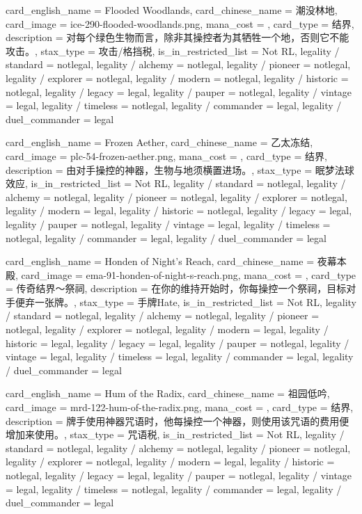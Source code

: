 \documentclass[lang = cn, color = black, 10pt]{AllThatStax}
\begin{document}
\card
{
	card_english_name = {Flooded Woodlands},
	card_chinese_name = {潮没林地},
	card_image = ice-290-flooded-woodlands.png,
	mana_cost = ,
	card_type = 结界,
	description = {对每个绿色生物而言，除非其操控者为其牺牲一个地，否则它不能攻击。},
	stax_type = 攻击/格挡税,
	is_in_restricted_list = Not RL,
	legality / standard = notlegal,
	legality / alchemy = notlegal,
	legality / pioneer = notlegal,
	legality / explorer = notlegal,
	legality / modern = notlegal,
	legality / historic = notlegal,
	legality / legacy = legal,
	legality / pauper = notlegal,
	legality / vintage = legal,
	legality / timeless = notlegal,
	legality / commander = legal,
	legality / duel_commander = legal
}

\card
{
	card_english_name = {Frozen Aether},
	card_chinese_name = {乙太冻结},
	card_image = plc-54-frozen-aether.png,
	mana_cost = ,
	card_type = 结界,
	description = {由对手操控的神器，生物与地须横置进场。},
	stax_type = 眠梦法球效应,
	is_in_restricted_list = Not RL,
	legality / standard = notlegal,
	legality / alchemy = notlegal,
	legality / pioneer = notlegal,
	legality / explorer = notlegal,
	legality / modern = legal,
	legality / historic = notlegal,
	legality / legacy = legal,
	legality / pauper = notlegal,
	legality / vintage = legal,
	legality / timeless = notlegal,
	legality / commander = legal,
	legality / duel_commander = legal
}

\card
{
	card_english_name = {Honden of Night's Reach},
	card_chinese_name = {夜幕本殿},
	card_image = ema-91-honden-of-night-s-reach.png,
	mana_cost = ,
	card_type = 传奇结界～祭祠,
	description = {在你的维持开始时，你每操控一个祭祠，目标对手便弃一张牌。},
	stax_type = 手牌Hate,
	is_in_restricted_list = Not RL,
	legality / standard = notlegal,
	legality / alchemy = notlegal,
	legality / pioneer = notlegal,
	legality / explorer = notlegal,
	legality / modern = legal,
	legality / historic = legal,
	legality / legacy = legal,
	legality / pauper = notlegal,
	legality / vintage = legal,
	legality / timeless = legal,
	legality / commander = legal,
	legality / duel_commander = legal
}

\card
{
	card_english_name = {Hum of the Radix},
	card_chinese_name = {祖园低吟},
	card_image = mrd-122-hum-of-the-radix.png,
	mana_cost = ,
	card_type = 结界,
	description = {牌手使用神器咒语时，他每操控一个神器，则使用该咒语的费用便增加来使用。},
	stax_type = 咒语税,
	is_in_restricted_list = Not RL,
	legality / standard = notlegal,
	legality / alchemy = notlegal,
	legality / pioneer = notlegal,
	legality / explorer = notlegal,
	legality / modern = legal,
	legality / historic = notlegal,
	legality / legacy = legal,
	legality / pauper = notlegal,
	legality / vintage = legal,
	legality / timeless = notlegal,
	legality / commander = legal,
	legality / duel_commander = legal
}
\end{document}
